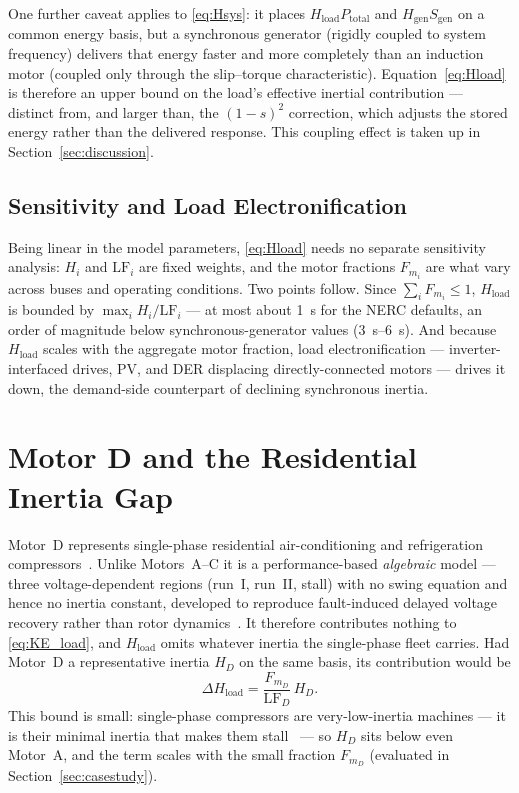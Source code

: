 \documentclass[journal]{IEEEtran}
\begin{document}
One further caveat applies to \eqref{eq:Hsys}: it places $H_{\mathrm{load}}P_{\mathrm{total}}$ and $H_{\mathrm{gen}}S_{\mathrm{gen}}$ on a common energy basis, but a synchronous generator (rigidly coupled to system frequency) delivers that energy faster and more completely than an induction motor (coupled only through the slip--torque characteristic). Equation~\eqref{eq:Hload} is therefore an upper bound on the load's effective inertial contribution --- distinct from, and larger than, the $(1-s)^2$ correction, which adjusts the stored energy rather than the delivered response. This coupling effect is taken up in Section~\ref{sec:discussion}.


\subsection{Sensitivity and Load Electronification}
\label{sec:sensitivity}
Being linear in the model parameters, \eqref{eq:Hload} needs no separate
sensitivity analysis: $H_i$ and $\mathrm{LF}_i$ are fixed weights, and the motor
fractions $F_{m_i}$ are what vary across buses and operating conditions. Two
points follow. Since $\sum_i F_{m_i}\le 1$, $H_{\mathrm{load}}$ is bounded by
$\max_i H_i/\mathrm{LF}_i$ --- at most about \SI{1}{\second} for the NERC
defaults, an order of magnitude below synchronous-generator values
(\SIrange{3}{6}{\second}). And because $H_{\mathrm{load}}$ scales with the
aggregate motor fraction, load electronification --- inverter-interfaced drives,
PV, and DER displacing directly-connected motors --- drives it down, the
demand-side counterpart of declining synchronous inertia.


\section{Motor D and the Residential Inertia Gap}
\label{sec:motord}
Motor~D represents single-phase residential air-conditioning and refrigeration
compressors~\cite{EPRI3002019209}. Unlike Motors~A--C it is a performance-based
\emph{algebraic} model --- three voltage-dependent regions (run~I, run~II, stall)
with no swing equation and hence no inertia constant, developed to reproduce
fault-induced delayed voltage recovery rather than rotor
dynamics~\cite{EPRI3002019209}. It therefore contributes nothing to
\eqref{eq:KE_load}, and $H_{\mathrm{load}}$ omits whatever inertia the
single-phase fleet carries. Had Motor~D a representative inertia $H_D$ on the
same basis, its contribution would be
\begin{equation}
    \Delta H_{\mathrm{load}} = \frac{F_{m_D}}{\mathrm{LF}_D}\, H_D .
    \label{eq:motord_bound}
\end{equation}
This bound is small: single-phase compressors are very-low-inertia machines --- it
is their minimal inertia that makes them stall~\cite{EPRI3002019209} --- so $H_D$
sits below even Motor~A, and the term scales with the small fraction $F_{m_D}$
(evaluated in Section~\ref{sec:casestudy}).
\end{document}
